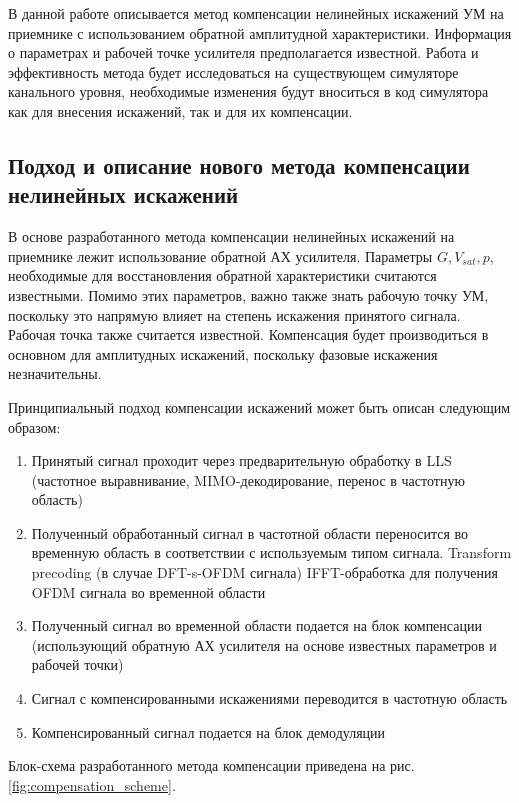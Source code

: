 В данной работе описывается метод компенсации нелинейных искажений УМ на
приемнике с использованием обратной амплитудной характеристики. Информация
о параметрах и рабочей точке усилителя предполагается известной. Работа и
эффективность метода будет исследоваться на существующем симуляторе
канального уровня, необходимые изменения будут вноситься в код симулятора
как для внесения искажений, так и для их компенсации.







\subsection{Подход и описание нового метода компенсации нелинейных искажений}
В основе разработанного метода компенсации нелинейных искажений на
приемнике лежит использование обратной АХ усилителя. Параметры $G, V_{sat},
p$, необходимые для восстановления обратной характеристики считаются
известными. Помимо этих параметров, важно также знать рабочую точку УМ,
поскольку это напрямую влияет на степень искажения принятого сигнала.
Рабочая точка также считается известной. Компенсация будет производиться
в основном для амплитудных искажений, поскольку фазовые искажения незначительны.

Принципиальный подход компенсации искажений может быть описан следующим
образом:
\begin{enumerate}
    \item Принятый сигнал проходит через предварительную обработку в LLS
    (частотное выравнивание, MIMO-декодирование, перенос в частотную
    область)
    \item Полученный обработанный сигнал в частотной области переносится во
    временную область в соответствии с используемым типом сигнала.
    \subitem Transform precoding (в случае DFT-s-OFDM сигнала)
    \subitem IFFT-обработка для получения OFDM сигнала во временной области
    \item Полученный сигнал во временной области подается на блок
    компенсации (использующий обратную АХ усилителя на основе известных
    параметров и рабочей точки)
    \item Сигнал с компенсированными искажениями переводится в частотную
    область
    \item Компенсированный сигнал подается на блок демодуляции
\end{enumerate}

Блок-схема разработанного метода компенсации приведена на рис.
\ref{fig:compensation_scheme}. 

